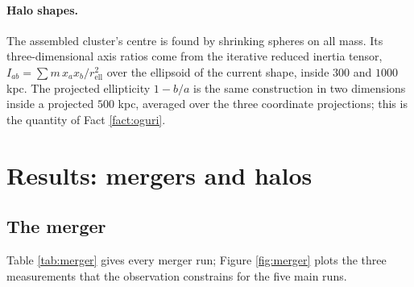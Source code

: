 \documentclass[11pt]{article}
\theoremstyle{definition}
\begin{document}
\paragraph{Halo shapes.} The assembled cluster's centre is found by shrinking spheres on all mass. Its three-dimensional axis ratios come from the iterative reduced inertia tensor, $I_{ab} = \sum m\,x_{a}x_{b}/r_{\mathrm{ell}}^{2}$ over the ellipsoid of the current shape, inside $300$ and $1000$ kpc. The projected ellipticity $1 - b/a$ is the same construction in two dimensions inside a projected $500$ kpc, averaged over the three coordinate projections; this is the quantity of Fact \ref{fact:oguri}.

\section{Results: mergers and halos}\label{sec:results}

\subsection{The merger}

Table \ref{tab:merger} gives every merger run; Figure \ref{fig:merger} plots the three measurements that the observation constrains for the five main runs.
\end{document}
